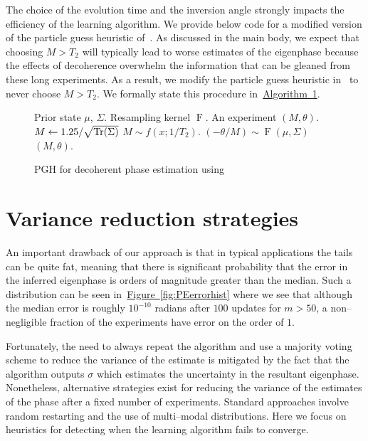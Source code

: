 \documentclass[aps,pra,amsmath,twocolumn,amssymb,superscriptaddress]{revtex4-1}
\newcommand{\CRej}{\text{RejS }}
\newcommand{\fig}[1]{\hyperref[fig:#1]{Figure~\ref*{fig:#1}}}
\newcommand{\alg}[1]{\hyperref[alg:#1]{Algorithm~\ref*{alg:#1}}}
\begin{document}
The choice of the evolution time and the inversion angle strongly impacts the efficiency of the learning algorithm.  We provide below code for a modified version of the
particle guess heuristic of~\cite{wiebe_quantum_2014}.  As discussed in the main body, we expect that choosing $M> T_2$ will typically lead to worse estimates of the eigenphase because the effects of decoherence overwhelm the information that can be gleaned from these long experiments.  As a result, we modify the particle guess heuristic in~\cite{wiebe_hamiltonian_2014} to never choose $M> T_2$.  We formally state this procedure in~\alg{pghT2}.
\begin{figure}
\begin{algorithm}[H]
    \caption{PGH for decoherent phase estimation using \CRej}
    \label{alg:pghT2}
\begin{algorithmic}
        \Require Prior \CRej state $\mu$, $\Sigma$. Resampling kernel $\operatorname{F}$.
        \Ensure  An experiment $(M, \theta)$.
        \Function{$\text{PGH}_\text{\CRej}$}{$\mu$, $\Sigma$, $T_2$}
            \State $M \gets 1.25 / \sqrt{{\rm Tr}(\Sigma)}$
        \State $M\sim f(x;1/T_2)$.
    \EndIf
            \State $(-\theta/M) \sim \operatorname{F}(\mu, \Sigma)$
            \State \Return $(M, \theta)$.
        \EndFunction
    \end{algorithmic}
\end{algorithm}
\end{figure}

\section{Variance reduction strategies}
An important drawback of our approach is that in typical applications the tails can be quite fat, meaning that there is significant probability that the error in the inferred eigenphase is orders of magnitude greater than the median.  Such a distribution can be seen in~\fig{PEerrorhist} where we see that although the median error is roughly $10^{-10}$ radians after $100$ updates for $m>50$,  a non--negligible fraction of the experiments have error on the order of $1$.  

Fortunately, the need to always repeat the algorithm and use a majority voting scheme to reduce the variance of the estimate is mitigated by the fact that the algorithm outputs $\sigma$ which estimates the uncertainty in the resultant eigenphase.  
Nonetheless, alternative strategies exist for reducing the variance of the estimates of the phase after a fixed number of experiments.  Standard approaches involve random restarting and the use of multi--modal distributions.  Here we focus on heuristics for detecting when the learning algorithm fails to converge.
\end{document}
